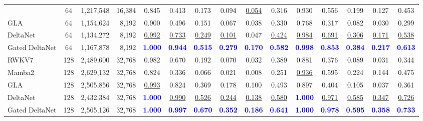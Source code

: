 \documentclass{article}
\newcommand{\1}{\bm{1}}
\theoremstyle{definition}
\begin{document}
\begin{table}[t]
\begin{tabular}{l|c|rr|cccccc|ccccc}
      & 64 & 1{,}217{,}548 & 16{,}384
      & 0.845 & 0.413 & 0.173 & 0.094 & \underline{0.054} & 0.316
      & 0.930 & 0.556 & 0.199 & 0.127 & 0.453 \\
    GLA
      & 64 & 1{,}154{,}624 & 8{,}192
      & 0.900 & 0.496 & 0.151 & 0.067 & 0.038 & 0.330
      & 0.768 & 0.317 & 0.082 & 0.030 & 0.299 \\
    DeltaNet
      & 64 & 1{,}134{,}272 & 8{,}192
      & \underline{0.992} & \underline{0.733} & \underline{0.249} & \underline{0.101} & 0.047 & \underline{0.424}
      & \underline{0.984} & \underline{0.691} & \underline{0.306} & \underline{0.171} & \underline{0.538} \\
    Gated DeltaNet
      & 64 & 1{,}167{,}878 & 8{,}192
      & \textcolor{blue}{\textbf{1.000}} & \textcolor{blue}{\textbf{0.944}} & \textcolor{blue}{\textbf{0.515}} & \textcolor{blue}{\textbf{0.279}} & \textcolor{blue}{\textbf{0.170}} & \textcolor{blue}{\textbf{0.582}}
      & \textcolor{blue}{\textbf{0.998}} & \textcolor{blue}{\textbf{0.853}} & \textcolor{blue}{\textbf{0.384}} & \textcolor{blue}{\textbf{0.217}} & \textcolor{blue}{\textbf{0.613}} \\
    \cmidrule(lr){1-13}
    RWKV7
      & 128 & 2{,}489{,}600 & 32{,}768
      & 0.982 & 0.670 & 0.192 & 0.070 & 0.032 & 0.389
      & 0.881 & 0.376 & 0.089 & 0.031 & 0.344 \\
    Mamba2
      & 128 & 2{,}629{,}132 & 32{,}768
      & 0.824 & 0.336 & 0.066 & 0.021 & 0.008 & 0.251
      & \underline{0.936} & 0.595 & 0.224 & 0.144 & 0.475 \\
    GLA
      & 128 & 2{,}505{,}856 & 32{,}768
      & \underline{0.993} & 0.824 & 0.369 & 0.178 & 0.100 & 0.493
      & 0.897 & 0.404 & 0.105 & 0.037 & 0.361 \\
    DeltaNet
      & 128 & 2{,}432{,}384 & 32{,}768
      & \textcolor{blue}{\textbf{1.000}} & \underline{0.990} & \underline{0.526} & \underline{0.244} & \underline{0.138} & \underline{0.580}
      & \textcolor{blue}{\textbf{1.000}} & \underline{0.971} & \underline{0.585} & \underline{0.347} & \underline{0.726} \\
    Gated DeltaNet
      & 128 & 2{,}565{,}126 & 32{,}768
      & \textcolor{blue}{\textbf{1.000}} & \textcolor{blue}{\textbf{0.997}} & \textcolor{blue}{\textbf{0.670}} & \textcolor{blue}{\textbf{0.352}} & \textcolor{blue}{\textbf{0.186}} & \textcolor{blue}{\textbf{0.641}}
      & \textcolor{blue}{\textbf{1.000}} & \textcolor{blue}{\textbf{0.978}} & \textcolor{blue}{\textbf{0.595}} & \textcolor{blue}{\textbf{0.358}} & \textcolor{blue}{\textbf{0.733}} \\

\end{tabular}
\end{table}
\end{document}
